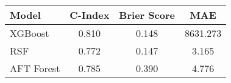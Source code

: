 \begin{tabular}{lccc}
\toprule
Model & C-Index & Brier Score & MAE \\
\midrule
XGBoost & 0.810 & 0.148 & 8631.273 \\
RSF & 0.772 & 0.147 & 3.165 \\
AFT Forest & 0.785 & 0.390 & 4.776 \\
\bottomrule
\end{tabular}
